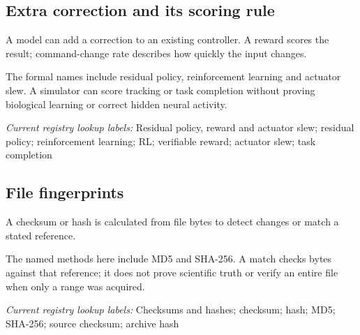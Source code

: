 \begin{samepage}
\subsection*{Extra correction and its scoring rule}
\noindent A model can add a correction to an existing controller. A reward scores the result; command-change rate describes how quickly the input changes.\par
\end{samepage}
\begin{samepage}
\noindent The formal names include residual policy, reinforcement learning and actuator slew. A simulator can score tracking or task completion without proving biological learning or correct hidden neural activity.\par\nopagebreak[4]

\end{samepage}


\noindent\textit{Current registry lookup labels:} Residual policy, reward and actuator slew; residual policy; reinforcement learning; RL; verifiable reward; actuator slew; task completion\par

\begin{samepage}
\subsection*{File fingerprints}
\noindent A checksum or hash is calculated from file bytes to detect changes or match a stated reference.\par
\end{samepage}
\begin{samepage}
\noindent The named methods here include MD5 and SHA-256. A match checks bytes against that reference; it does not prove scientific truth or verify an entire file when only a range was acquired.\par\nopagebreak[4]

\end{samepage}


\noindent\textit{Current registry lookup labels:} Checksums and hashes; checksum; hash; MD5; SHA-256; source checksum; archive hash\par

